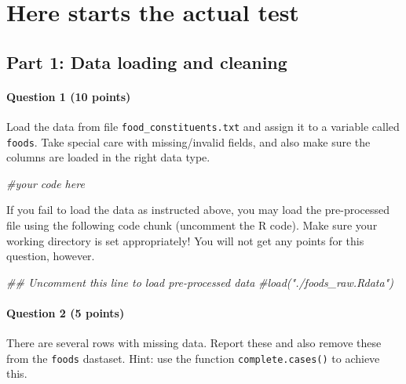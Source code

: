 \documentclass[
  a4paper]{article}
\newenvironment{Shaded}{\begin{snugshade}}{\end{snugshade}}
\newcommand{\CommentTok}[1]{\textcolor[rgb]{0.56,0.35,0.01}{\textit{#1}}}
\begin{document}
\hypertarget{here-starts-the-actual-test}{%
\section{Here starts the actual
test}\label{here-starts-the-actual-test}}

\hypertarget{part-1-data-loading-and-cleaning}{%
\subsection{Part 1: Data loading and
cleaning}\label{part-1-data-loading-and-cleaning}}

\hypertarget{question-1-10-points}{%
\paragraph{Question 1 (10 points)}\label{question-1-10-points}}

Load the data from file \texttt{food\_constituents.txt} and assign it to
a variable called \texttt{foods}. Take special care with missing/invalid
fields, and also make sure the columns are loaded in the right data
type.

\begin{Shaded}
\begin{Highlighting}[]
\CommentTok{#your code here}
\end{Highlighting}
\end{Shaded}

If you fail to load the data as instructed above, you may load the
pre-processed file using the following code chunk (uncomment the R
code). Make sure your working directory is set appropriately! You will
not get any points for this question, however.

\begin{Shaded}
\begin{Highlighting}[]
\CommentTok{## Uncomment this line to load pre-processed data}
\CommentTok{#load("./foods_raw.Rdata")}
\end{Highlighting}
\end{Shaded}

\hypertarget{question-2-5-points}{%
\paragraph{Question 2 (5 points)}\label{question-2-5-points}}

There are several rows with missing data. Report these and also remove
these from the \texttt{foods} dastaset. Hint: use the function
\texttt{complete.cases()} to achieve this.
\end{document}

